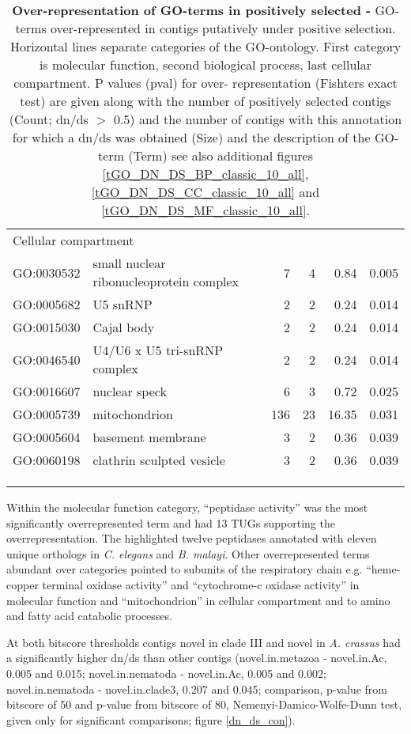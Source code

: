\begin{longtable}{lp{4.5cm}rrrl}
  \multicolumn{6}{l}{Cellular compartment}  \\ 
  GO:0030532 & small nuclear ribonucleoprotein complex &   7 &   4 & 0.84 & 0.005 \\ 
  GO:0005682 & U5 snRNP &   2 &   2 & 0.24 & 0.014 \\ 
  GO:0015030 & Cajal body &   2 &   2 & 0.24 & 0.014 \\ 
  GO:0046540 & U4/U6 x U5 tri-snRNP complex &   2 &   2 & 0.24 & 0.014 \\ 
  GO:0016607 & nuclear speck &   6 &   3 & 0.72 & 0.025 \\ 
  GO:0005739 & mitochondrion & 136 &  23 & 16.35 & 0.031 \\ 
  GO:0005604 & basement membrane &   3 &   2 & 0.36 & 0.039 \\ 
  GO:0060198 & clathrin sculpted vesicle &   3 &   2 & 0.36 & 0.039 \\ 
\hline\\
\caption[Over-representation of GO-terms in positively
selected]{\textbf{Over-representation of GO-terms in positively
    selected -} GO-terms over-represented in contigs putatively under
  positive selection. Horizontal lines separate categories of the
  GO-ontology. First category is molecular function, second biological
  process, last cellular compartment. P values (pval) for over-
  representation (Fishters exact test) are given along with the number
  of positively selected contigs (Count; dn/ds $>$ 0.5) and the number
  of contigs with this annotation for which a dn/ds was obtained
  (Size) and the description of the GO-term (Term) see also additional
  figures \ref{tGO_DN_DS_BP_classic_10_all},
  \ref{tGO_DN_DS_CC_classic_10_all} and
  \ref{tGO_DN_DS_MF_classic_10_all}.}\\
\label{go-pos}
\end{longtable}

Within the molecular function category, ``peptidase activity'' was the
most significantly overrepresented term and had 13 TUGs supporting the
overrepresentation. The highlighted twelve peptidases annotated with
eleven unique orthologs in \textit{C. elegans} and \textit{B. malayi}.
Other overrepresented terms abundant over categories pointed to
subunits of the respiratory chain e.g. ``heme-copper terminal oxidase
activity'' and ``cytochrome-c oxidase activity'' in molecular function
and ``mitochondrion'' in cellular compartment and to amino and fatty
acid catabolic processes.

At both bitscore thresholds contigs novel in clade III and novel in
\textit{A. crassus} had a significantly higher dn/ds than other
contigs (novel.in.metazoa - novel.in.Ac, 0.005 and 0.015;
novel.in.nematoda - novel.in.Ac, 0.005 and 0.002; novel.in.nematoda -
novel.in.clade3, 0.207 and 0.045; comparison, p-value from bitscore of
50 and p-value from bitscore of 80, Nemenyi-Damico-Wolfe-Dunn test,
given only for significant comparisons; figure \ref{dn_ds_con}).

